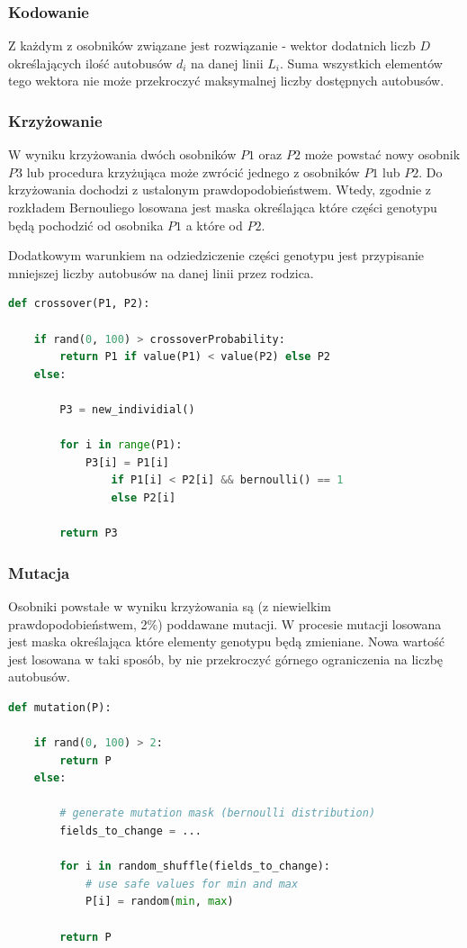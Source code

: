 \documentclass[polish,12pt]{aghthesis}
\begin{document}
\subsubsection{Kodowanie}
Z każdym z osobników związane jest rozwiązanie - wektor dodatnich liczb $D$ określających ilość autobusów $d_i$ na danej linii $L_i$. Suma wszystkich elementów tego wektora nie może przekroczyć maksymalnej liczby dostępnych autobusów.

\subsubsection{Krzyżowanie}
W wyniku krzyżowania dwóch osobników $P1$ oraz $P2$ może powstać nowy osobnik $P3$ lub procedura krzyżująca może zwrócić jednego z osobników $P1$ lub $P2$. Do krzyżowania dochodzi z ustalonym prawdopodobieństwem. Wtedy, zgodnie z rozkładem Bernouliego losowana jest maska określająca które części genotypu będą pochodzić od osobnika $P1$ a które od $P2$.

Dodatkowym warunkiem na odziedziczenie części genotypu jest przypisanie mniejszej liczby autobusów na danej linii przez rodzica.

\begin{lstlisting}[language=Python]
def crossover(P1, P2):

	if rand(0, 100) > crossoverProbability:
		return P1 if value(P1) < value(P2) else P2
	else:
	
		P3 = new_individial()
	
		for i in range(P1):
			P3[i] = P1[i]
				if P1[i] < P2[i] && bernoulli() == 1
				else P2[i]
				
		return P3

\end{lstlisting}

\subsubsection{Mutacja}
Osobniki powstałe w wyniku krzyżowania są (z niewielkim prawdopodobieństwem, 2\%) poddawane mutacji. W procesie mutacji losowana jest maska określająca które elementy genotypu będą zmieniane. Nowa wartość jest losowana w taki sposób, by nie przekroczyć górnego ograniczenia na liczbę autobusów.

\begin{lstlisting}[language=Python]
def mutation(P):

	if rand(0, 100) > 2:
		return P
	else:
	
		# generate mutation mask (bernoulli distribution)
		fields_to_change = ...
	
		for i in random_shuffle(fields_to_change):
			# use safe values for min and max
			P[i] = random(min, max)
	
		return P
	
\end{lstlisting}
\end{document}
